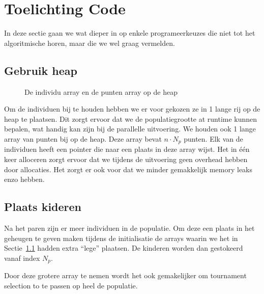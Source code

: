 %

\section{Toelichting Code}
In deze sectie gaan we wat dieper in op enkele programeerkeuzes
die niet tot het algoritmische horen, maar die we wel graag vermelden.
\label{sec:explainationcode}
\subsection{Gebruik heap}
\label{sub:heap}
\begin{figure}[H]
\centering
{}
\caption{De individu array en de punten array op de heap}
\end{figure}
Om de individuen bij te houden hebben we er voor gekozen ze in 1 lange rij op de heap te plaatsen. Dit zorgt ervoor dat we de populatiegrootte at runtime kunnen bepalen, wat handig kan zijn bij de parallelle  uitvoering. We houden ook 1 lange array van punten bij op de heap. Deze array bevat $n\cdot N_p$ punten. Elk van de individuen heeft een pointer die naar een plaats in deze array wijst. Het in één keer alloceren zorgt ervoor dat we tijdens de uitvoering geen overhead hebben door allocaties. Het zorgt er ook voor dat we minder gemakkelijk memory leaks enzo hebben.

\subsection{Plaats kideren}
Na het paren zijn er meer individuen in de populatie. Om deze een plaats in het geheugen te geven maken tijdens de initialisatie de arrays waarin we het in Sectie~\ref{sub:heap} hadden extra ``lege'' plaatsen. De kinderen worden dan gestokeerd vanaf index $N_p$.

Door deze grotere array te nemen wordt het ook gemakelijker om tournament selection to te passen op heel de populatie.

